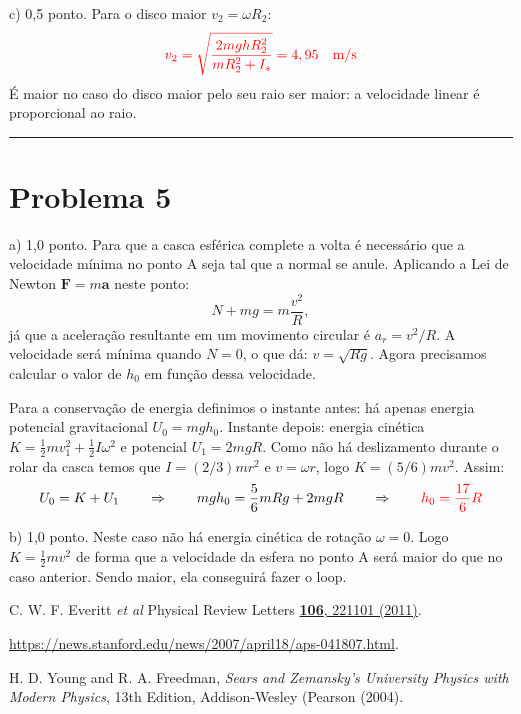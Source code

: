 \documentclass[a4paper, 11pt]{article}
\begin{document}
{\color{red}c) 0,5 ponto.} Para o disco maior $v_2 = \omega R_2$:
\begin{equation}
{\color{red}v_2 = \sqrt{ \dfrac{2mghR_2^2}{m R_2^2 + I_s}  } = 4,95 \quad \text{m/s}} \nonumber 
\end{equation}
É maior no caso do disco maior pelo seu raio ser maior: a velocidade linear é proporcional ao raio.


 {\noindent\def\stackalignment{l}{\textcolor{lightcyan}{\rule{\linewidth}{2pt}}}\medskip}


\section*{Problema 5} 

{\color{red}a) 1,0 ponto.} Para que a casca esférica complete a volta é necessário que a velocidade mínima no ponto A seja tal que a normal se anule. Aplicando a Lei de Newton $\textbf{F} = m\textbf{a}$ neste ponto:
\begin{equation}
N + mg = m \dfrac{v^2}{R}, \nonumber
\end{equation}
já que a aceleração resultante em um movimento circular é $a_r = v^2/R$. A velocidade será mínima quando $N=0$, o que dá: $v = \sqrt{Rg}$. Agora precisamos calcular o valor de $h_0$ em função dessa velocidade.

Para a conservação de energia definimos o instante antes: há apenas energia potencial gravitacional $U_0 = mgh_0$. Instante depois: energia cinética $K = \frac{1}{2}mv_1^2 + \frac{1}{2} I \omega^2$ e potencial $U_1 = 2mgR$. Como não há deslizamento durante o rolar da casca temos que $I=(2/3)mr^2$ e $v = \omega r$, logo $K = (5/6) mv^2$. Assim:
\begin{equation}
U_0 = K+U_1 \qquad  \Rightarrow \qquad mgh_0 = \dfrac{5}{6} m Rg + 2mgR \qquad \Rightarrow \qquad {\color{red}h_0 = \frac{17}{6}R} \nonumber 
\end{equation}

{\color{red}b) 1,0 ponto.} Neste caso não há energia cinética de rotação $\omega = 0$. Logo $K=\frac{1}{2}mv^2$ de forma que a velocidade da esfera no ponto A será maior do que no caso anterior. Sendo maior, ela conseguirá fazer o loop.

\begin{thebibliography}{99}

 C. W. F. Everitt \textit{et al} Physical Review Letters \href{ttps://doi.org/10.1103/PhysRevLett.106.221101}{\textbf{106}, 221101 (2011)}.

 \url{https://news.stanford.edu/news/2007/april18/aps-041807.html}.

 H. D. Young and R. A. Freedman, \textit{Sears and Zemansky's University Physics with Modern Physics}, 13th Edition, Addison-Wesley (Pearson (2004).


\end{thebibliography}
\end{document}
